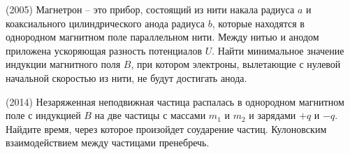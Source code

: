 \begin{ex}
(2005)  Магнетрон -- это прибор, состоящий из нити накала радиуса $a$ и коаксиального цилиндрического анода радиуса $b$, которые находятся в однородном магнитном поле параллельном нити. Между нитью и анодом приложена ускоряющая разность потенциалов $U$. Найти минимальное значение индукции магнитного поля $B$, при котором электроны, вылетающие с нулевой начальной скоростью из нити, не будут достигать анода.
\begin{ans}
\end{ans}
\end{ex}

\begin{ex}
(2014) Незаряженная неподвижная частица распалась в однородном магнитном поле с индукцией $B$ на две частицы с массами $m_1$ и $m_2$ и зарядами $+q$ и $-q$. Найдите время, через которое произойдет соударение частиц. Кулоновским взаимодействием между частицами пренебречь.
\begin{ans}
\end{ans}
\end{ex}
